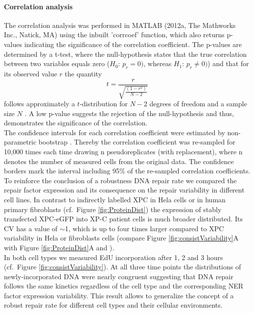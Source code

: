 \paragraph{Correlation analysis}
The correlation analysis was performed in MATLAB (2012a, The Mathworks Inc., Natick, MA) using the inbuilt 'corrcoef' function, which also returns p-values indicating the significance of the correlation coefficient. The p-values are determined by a t-test, where the null-hypothesis states that the true correlation between two variables equals zero ($H_0: \, p_r=0)$, whereas $H_1: \, p_r\neq0)$) and that for its observed value $r$ the quantity 
\begin{equation}
t = \frac{r}{\sqrt{\frac{(1-r^2)}{N-2}}}
\end{equation}     
follows approximately a $t$-distribution for $N-2$ degrees of freedom and a sample size $N$ \cite{Kendall1979,Fisher1958}. A low p-value suggests the rejection of the null-hypothesis and thus, demonstrates the significance of the correlation.\\
The confidence intervals for each correlation coefficient were estimated by non-parametric bootstrap \cite{Efron1979}. Thereby the correlation coefficient was re-sampled for 10,000 times each time drawing n pseudoreplicates (with replacement), where n denotes the number of measured cells from the original data. The confidence borders mark the interval including 95\% of the re-sampled correlation coefficients.\\       

To reinforce the conclusion of a robustness DNA repair rate we compared the repair factor expression and its consequence on the repair variability in different cell lines. In contrast to indirectly labelled XPC in Hela cells \cite{Verbruggen2014} or in human primary fibroblasts (cf.\ Figure \ref{fig:ProteinDist}) the expression of stably transfected XPC-eGFP into XP-C patient cells is much broader distributed. Its CV has a value of $\sim$1, which is up to four times larger compared to XPC variability in Hela or fibroblasts cells (compare Figure \ref{fig:consistVariability}A with Figure \ref{fig:ProteinDist}A and \cite{Verbruggen2014}). \\
In both cell types we measured EdU incorporation after 1, 2 and 3 hours (cf.\ Figure \ref{fig:consistVariability}). At all three time points the distributions of newly-incorporated DNA were nearly congruent suggesting that DNA repair follows the same kinetics regardless of the cell type and the corresponding NER factor expression variability. This result allows to generalize the concept of a robust repair rate for different cell types and their cellular environments.\\ 







